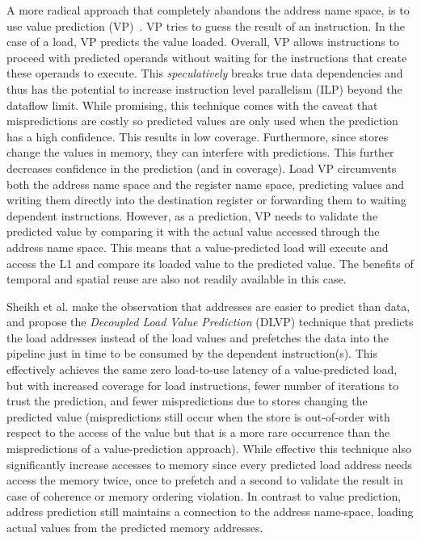 \documentclass{sig-alternate}
\begin{document}
A more radical approach that completely abandons the address name space, is to use value prediction (VP)~\cite{lipasti-shen, others more recent}. VP tries to guess the result of an instruction. In the case of a load, VP predicts the value loaded. Overall, VP allows instructions to proceed with predicted operands without waiting for the instructions that create these operands to execute. This \emph{speculatively} breaks true data dependencies and thus has the potential to increase instruction level parallelism (ILP) beyond the dataflow limit.
While promising, this technique comes with the caveat that mispredictions are costly so predicted values are only used when the prediction has a high confidence. This results in low coverage. Furthermore, since stores change the values in memory, they can interfere with predictions. This further decreases confidence in the prediction (and in coverage).
Load VP circumvents both the address name space and the register name space, predicting values and writing them directly into the destination register or forwarding them to waiting dependent instructions. However, as a prediction, VP needs to validate the predicted value by comparing it with the actual value accessed through the address name space. This means that a value-predicted load will execute and access the L1 and compare its loaded value to the predicted value. The benefits of temporal and spatial reuse are also not readily available in this case.
 
Sheikh et al. make the observation that addresses are easier to predict than data, and propose the \textit{Decoupled Load Value Prediction} (DLVP) technique that predicts the load addresses instead of the load values and prefetches the data into the pipeline just in time to be consumed by the dependent instruction(s). This effectively achieves the same zero load-to-use latency of a value-predicted load, but with increased coverage for load instructions, fewer number of iterations to trust the prediction, and fewer mispredictions due to stores changing the predicted value (mispredictions still occur when the store is out-of-order with respect to the access of the value but that is a more rare occurrence than the mispredictions of a value-prediction approach).
While effective this technique also significantly increase accesses to memory since every predicted load address needs access the memory twice, once to prefetch and a second to validate the result in case of coherence or memory ordering violation. 
In contrast to value prediction, address prediction still maintains a connection to the address name-space, loading actual values from the predicted memory addresses.
\end{document}
